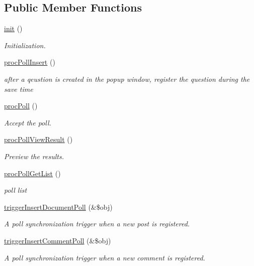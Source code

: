\subsection*{Public Member Functions}
\begin{DoxyCompactItemize}
\item 
\hyperlink{classpollController_a963891da278c1adc2400f688270342a2}{init} ()
\begin{DoxyCompactList}\small\item\em Initialization. \end{DoxyCompactList}\item 
\hyperlink{classpollController_a22722ed2a0810a54f9abfd098cd3d25c}{proc\-Poll\-Insert} ()
\begin{DoxyCompactList}\small\item\em after a qeustion is created in the popup window, register the question during the save time \end{DoxyCompactList}\item 
\hyperlink{classpollController_a78770967734dc31fdfe1bba48d7e6196}{proc\-Poll} ()
\begin{DoxyCompactList}\small\item\em Accept the poll. \end{DoxyCompactList}\item 
\hyperlink{classpollController_a0fedbcad279a12cdf95a0f1d878bbfea}{proc\-Poll\-View\-Result} ()
\begin{DoxyCompactList}\small\item\em Preview the results. \end{DoxyCompactList}\item 
\hyperlink{classpollController_a7b10edf49b567e9d239c2e6bf8b12e93}{proc\-Poll\-Get\-List} ()
\begin{DoxyCompactList}\small\item\em poll list \end{DoxyCompactList}\item 
\hyperlink{classpollController_ae2ad5e6f6c89c2aee07208a8a66ef5e7}{trigger\-Insert\-Document\-Poll} (\&\$obj)
\begin{DoxyCompactList}\small\item\em A poll synchronization trigger when a new post is registered. \end{DoxyCompactList}\item 
\hyperlink{classpollController_a9676dc5c2762bf1c7818828d6ccf3efa}{trigger\-Insert\-Comment\-Poll} (\&\$obj)
\begin{DoxyCompactList}\small\item\em A poll synchronization trigger when a new comment is registered. \end{DoxyCompactList}\item 

\end{DoxyCompactItemize}
